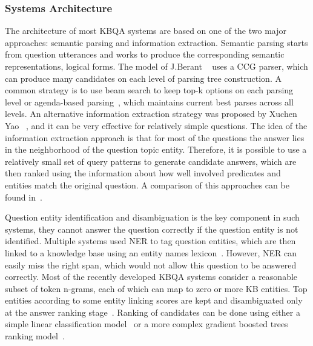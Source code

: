 \subsubsection{Systems Architecture}
\label{section:relatedwork:factoid:kbqa:architecture}

The architecture of most KBQA systems are based on one of the two major approaches: semantic parsing and information extraction.
Semantic parsing starts from question utterances and works to produce the corresponding semantic representations, \eg logical forms.
The model of J.Berant \etal~\cite{BerantCFL13:sempre} uses a CCG parser, which can produce many candidates on each level of parsing tree construction.
A common strategy is to use beam search to keep top-k options on each parsing level or agenda-based parsing~\cite{berant2015imitation}, which maintains current best parses across all levels.
An alternative information extraction strategy was proposed by Xuchen Yao \etal~\cite{YaoD14}, and it can be very effective for relatively simple questions.
The idea of the information extraction approach is that for most of the questions the answer lies in the neighborhood of the question topic entity.
Therefore, it is possible to use a relatively small set of query patterns to generate candidate answers, which are then ranked using the information about how well involved predicates and entities match the original question.
A comparison of this approaches can be found in~\cite{yao2014freebase}.

Question entity identification and disambiguation is the key component in such systems, they cannot answer the question correctly if the question entity is not identified.
Multiple systems used NER to tag question entities, which are then linked to a knowledge base using an entity names lexicon~\cite{BerantCFL13:sempre,BerantL14:parasempre,xu2014answering}.
However, NER can easily miss the right span, which would not allow this question to be answered correctly.
Most of the recently developed KBQA systems consider a reasonable subset of token n-grams, each of which can map to zero or more KB entities.
Top entities according to some entity linking scores are kept and disambiguated only at the answer ranking stage~\cite{bastmore:cikm:2015:aquu,yao-scratch-qa-naacl2015,yih:ACL:2015:STAGG}.
Ranking of candidates can be done using either a simple linear classification model~\cite{yao-scratch-qa-naacl2015} or a more complex gradient boosted trees ranking model~\cite{bastmore:cikm:2015:aquu,yih:ACL:2015:STAGG}.

